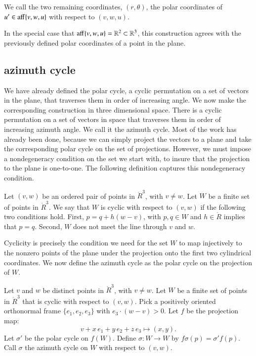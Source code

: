 \begin{definition}\label{def:polar}
We call  the two remaining coordinates, $(r,\theta)$, 
the polar coordinates of $u'\in{\operatorname{aff}}\{v,w,u\}$ with
respect to $(v,w,u)$.
\end{definition}

In the special case that ${\operatorname{aff}}\{v,w,u\}=\mathbb{R}^2\subset \mathbb{R}^3$, this
construction agrees with the previously defined polar coordinates of a point in
the plane.

\subsection{azimuth cycle}

We have already defined the polar cycle, a cyclic permutation on a set
of vectors in the plane, that traverses them in order of increasing
angle.  We now make the corresponding construction in three dimensional
space.  There is  a cyclic permutation on a set of vectors in space
that traverses them in order of increasing azimuth angle.  We call it
the azimuth cycle.  Most of the work has already been done, because we
can simply project the vectors to a plane and take the corresponding
polar cycle on the set of projections.  However, we must impose
a nondegeneracy condition on the set we start with, to insure that
the projection to the plane is one-to-one.  The following
definition captures this nondegeneracy condition.


\begin{definition} Let $(v,w)$ be an ordered pair of points in
$\ring{R}^3$, with $v\ne w$.
Let $W$ be a finite set of points in $\ring{R}^3$.
We say that $W$ is cyclic with respect to $(v,w)$ if
the following two conditions hold.
First, $p = q + h (w-v)$, with $p,q\in W$ and $h\in \ring{R}$
implies that $p=q$.  Second, $W$ does not meet the line
through $v$ and $w$.
\end{definition}

Cyclicity is precisely the condition we need for the
set $W$ to map injectively to the nonzero points of the 
plane under the projection
onto the first two cylindrical coordinates.  We now define
the azimuth cycle as the polar cycle on the projection of $W$.

\begin{definition}
Let $v$ and $w$ be distinct points in
$\ring{R}^3$, with $v\ne w$.
Let $W$ be a finite set of points in $\ring{R}^3$ that is
cyclic  with respect to $(v,w)$.
Pick a positively oriented orthonormal frame $\{e_1,e_2,e_3\}$
with $e_3\cdot (w-v) > 0$.
Let $f$ be the projection map:
   $$v + x\, e_1 + y\, e_2 + z\, e_3 \mapsto
     (x,y).$$
Let $\sigma'$ be the polar cycle on $f(W)$. Define 
$\sigma:W\to W$ by $f\sigma(p) =\sigma'f(p)$.
Call $\sigma$ the azimuth cycle
on $W$ with respect to $(v,w)$.
\end{definition}

